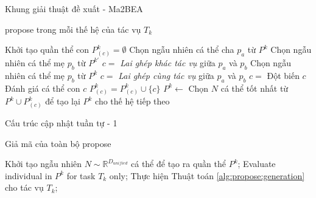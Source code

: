\begin{frame}{Khung giải thuật đề xuất - Ma2BEA}
    \begin{algorithm}[H]
        \caption{\gls{propose} trong mỗi thế hệ của tác vụ $T_k$}
        \fontsize{6pt}{10}\selectfont
        \begin{algorithmic}[1]
            \State Khởi tạo quần thể con $P_{(c)}^k=\emptyset$
                \State Chọn ngẫu nhiên cá thể cha $p_a$ từ $P^k$
                    \State Chọn ngẫu nhiên cá thể mẹ $p_b$ từ $P^{k'}$
                    \State $c = $ \emph{Lai ghép khác tác vụ} giữa $p_a$ và $p_b$
                \Else
                    \State Chọn ngẫu nhiên cá thể mẹ $p_b$ từ $P^k$
                    \State $c = $ \emph{Lai ghép cùng tác vụ} giữa $p_a$ và $p_b$
                \EndIf
                \State $c =$ Đột biến $c$
                \State Đánh giá cá thể con $c$
                \State $P^k_{(c)} = P^k_{(c)} \cup \{c\}$
            \EndWhile
            \State $P^k \leftarrow$ Chọn $N$ cá thể tốt nhất từ $P^k \cup P^k_{(c)}$ để tạo lại $P^k$ cho thế hệ tiếp theo
        \end{algorithmic}
        \label{alg:propose:generation}
    \end{algorithm}
\end{frame}

\begin{frame}{Cấu trúc cập nhật tuần tự - 1}
    \begin{algorithm}[H]
        \caption{Giả mã của toàn bộ \gls{propose}}
        \begin{algorithmic}[1]
                \State Khởi tạo ngẫu nhiên $N \sim \mathbb{R}^{D_{unified}}$ cá thể để tạo ra quần thể $P^k$;
                \State Evaluate individual in $P^k$ for task $T_k$ only;
            \EndFor
                    \State Thực hiện Thuật toán \ref{alg:propose:generation} cho tác vụ $T_k$;
                \EndFor
            \EndWhile
        \end{algorithmic}
        \label{alg:propose:propose}
    \end{algorithm}
\end{frame}

